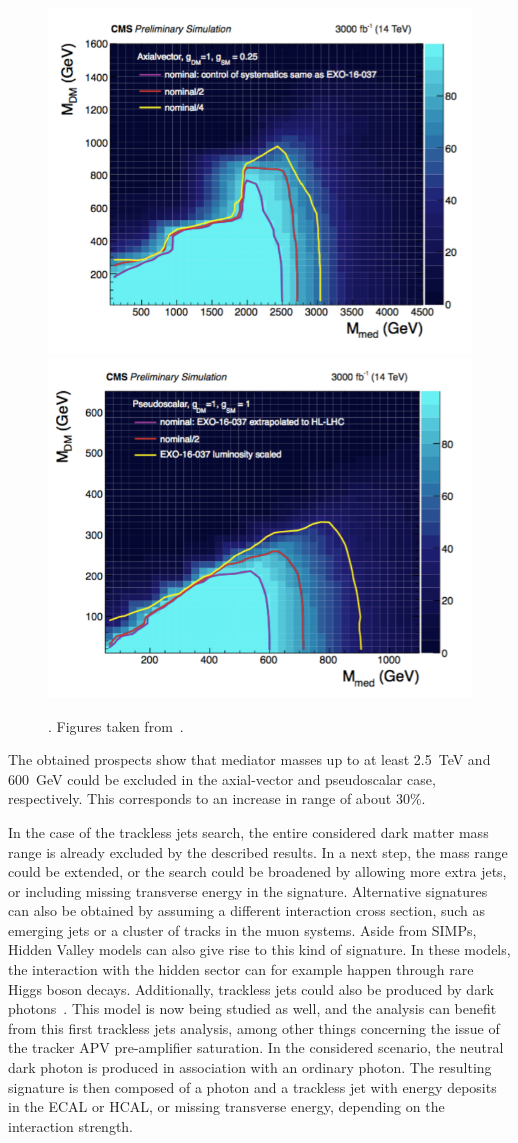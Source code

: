 \begin{figure}[ht]
  \centering
 \includegraphics[width=.49\textwidth]{monojet_axial}
 \includegraphics[width=.49\textwidth]{monojet_pseudoscalar}
 \caption{. Figures taken from~\cite{CMS-DP-2016-064}.}
 \label{fig:monojet_HLLHC}
\end{figure}

The obtained prospects show that mediator masses up to at least \SI{2.5}{TeV} and \SI{600}{GeV} could be excluded in the axial-vector and pseudoscalar case, respectively. This corresponds to an increase in range of about 30\%.

In the case of the trackless jets search, the entire considered dark matter mass range is already excluded by the described results. In a next step, the mass range could be extended, or the search could be broadened by allowing more extra jets, or including missing transverse energy in the signature. Alternative signatures can also be obtained by assuming a different interaction cross section, such as emerging jets or a cluster of tracks in the muon systems. Aside from \acp{SIMP}, Hidden Valley models can also give rise to this kind of signature. In these models, the interaction with the hidden sector can for example happen through rare Higgs boson decays. Additionally, trackless jets could also be produced by dark photons~\cite{Izaguirre:2015eya}. This model is now being studied as well, and the analysis can benefit from this first trackless jets analysis, among other things concerning the issue of the tracker APV pre-amplifier saturation. In the considered scenario, the neutral dark photon is produced in association with an ordinary photon. The resulting signature is then composed of a photon and a trackless jet with energy deposits in the \ac{ECAL} or \ac{HCAL}, or missing transverse energy, depending on the interaction strength. 



\clearpage{\pagestyle{empty}\cleardoublepage}
